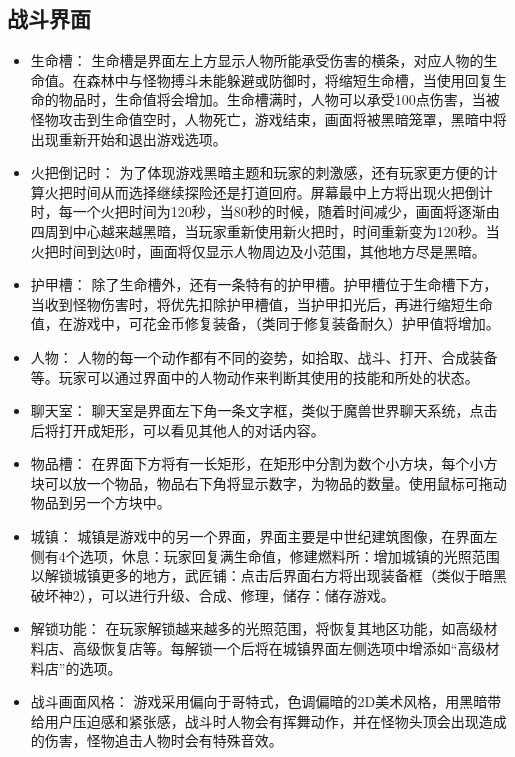 \documentclass[UTF8,AutoFakeBold=1,AutoFakeSlant,zihao=-4]{cucthesis}
\begin{document}
\subsection{战斗界面}

\begin{itemize}
    \item 生命槽：
    生命槽是界面左上方显示人物所能承受伤害的横条，对应人物的生命值。在森林中与怪物搏斗未能躲避或防御时，将缩短生命槽，当使用回复生命的物品时，生命值将会增加。生命槽满时，人物可以承受100点伤害，当被怪物攻击到生命值空时，人物死亡，游戏结束，画面将被黑暗笼罩，黑暗中将出现重新开始和退出游戏选项。
    \item 火把倒记时：
    为了体现游戏黑暗主题和玩家的刺激感，还有玩家更方便的计算火把时间从而选择继续探险还是打道回府。屏幕最中上方将出现火把倒计时，每一个火把时间为120秒，当80秒的时候，随着时间减少，画面将逐渐由四周到中心越来越黑暗，当玩家重新使用新火把时，时间重新变为120秒。当火把时间到达0时，画面将仅显示人物周边及小范围，其他地方尽是黑暗。
    \item 护甲槽：
    除了生命槽外，还有一条特有的护甲槽。护甲槽位于生命槽下方，当收到怪物伤害时，将优先扣除护甲槽值，当护甲扣光后，再进行缩短生命值，在游戏中，可花金币修复装备，（类同于修复装备耐久）护甲值将增加。
    \item 人物：
    人物的每一个动作都有不同的姿势，如拾取、战斗、打开、合成装备等。玩家可以通过界面中的人物动作来判断其使用的技能和所处的状态。
    \item 聊天室：
    聊天室是界面左下角一条文字框，类似于魔兽世界聊天系统，点击后将打开成矩形，可以看见其他人的对话内容。
    \item 物品槽：
    在界面下方将有一长矩形，在矩形中分割为数个小方块，每个小方块可以放一个物品，物品右下角将显示数字，为物品的数量。使用鼠标可拖动物品到另一个方块中。
    \item 城镇：
    城镇是游戏中的另一个界面，界面主要是中世纪建筑图像，在界面左侧有4个选项，休息：玩家回复满生命值，修建燃料所：增加城镇的光照范围以解锁城镇更多的地方，武匠铺：点击后界面右方将出现装备框（类似于暗黑破坏神2），可以进行升级、合成、修理，储存：储存游戏。    
    \item 解锁功能：
    在玩家解锁越来越多的光照范围，将恢复其地区功能，如高级材料店、高级恢复店等。每解锁一个后将在城镇界面左侧选项中增添如“高级材料店”的选项。
    \item 战斗画面风格：
    游戏采用偏向于哥特式，色调偏暗的2D美术风格，用黑暗带给用户压迫感和紧张感，战斗时人物会有挥舞动作，并在怪物头顶会出现造成的伤害，怪物追击人物时会有特殊音效。    
\end{itemize}
\end{document}
